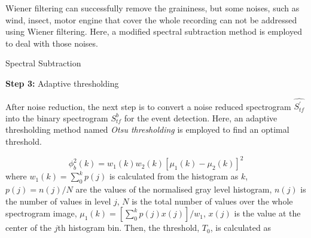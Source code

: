 \noindent Wiener filtering can successfully remove the graininess, but some noises, such as wind,
insect, motor engine that cover the whole recording can not be addressed using Wiener filtering. Here, a modified spectral subtraction method is employed to deal with those noises. 


\begin{algorithm}
\DontPrintSemicolon
{}

\caption{Spectral Subtraction\label{IR}}

\end{algorithm}

\noindent \textbf{Step 3:} Adaptive thresholding

\noindent After noise reduction, the next step is to convert a noise reduced spectrogram $\hat{S^{'}_{tf}}$ into the binary spectrogram $S^{b}_{tf}$ for the event detection. Here, an adaptive thresholding method named \textit{Otsu thresholding} \citep{otsu1975threshold} is employed to find an optimal threshold.

\begin{equation}
\phi_{b}^{2}(k)=w_{1}(k)w_{2}(k)[\mu_{1}(k)-\mu_{2}(k)]^{2}
\end{equation}
\noindent where $w_{1}(k)=\sum_{0}^{k}p(j)$ is calculated from the histogram as $k$, $p(j)=n(j)/N$ are the values of the normalised gray level histogram, $n(j)$ is the number of values in level $j$, $N$ is the total number of values over the whole spectrogram image, $\mu_{1}(k)=[\sum_{0}^{k}p(j)x(j)]/w_{1}$, $x(j)$ is the value at the center of the $j$th histogram bin. Then, the threshold, $T_{0}$, is calculated as


